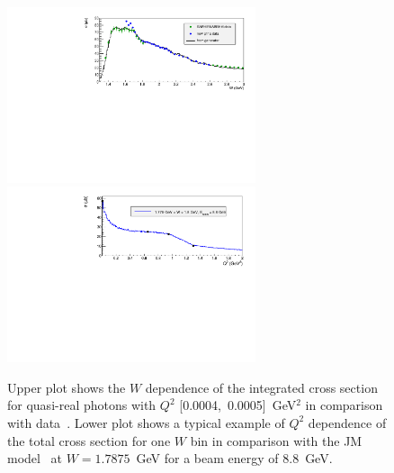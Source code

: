 \begin{figure}[!ht]
\begin{center}
\includegraphics[width=0.65\textwidth]{pictures/quality/photon_point_gen_comp.pdf}
\includegraphics[width=0.65\textwidth]{pictures/quality/q2_dep_gen_comp.pdf}
\end{center}
\vspace{-0.6cm}
\caption{\small Upper plot shows the $W$ dependence of the integrated cross section for quasi-real photons with $Q^2$ [0.0004,~0.0005]~GeV$^2$ in comparison with data~\cite{Golovach:note,Wu:2005wf,ABBHHM:1968aa}. Lower plot shows a typical example of $Q^2$ dependence of the total cross section for one $W$ bin in comparison with the JM model~\cite{Mokeev:2015lda}  at $W = 1.7875$~GeV for a beam energy of 8.8~GeV.}
\label{fig:eg_ph_point}
\end{figure}




